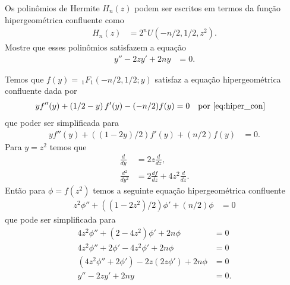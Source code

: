 \documentclass[a4paper,12pt, leqno, answers]{exam}
\begin{document}
\begin{questions}
     Os polinômios de Hermite $H_n(z)$ podem ser escritos em termos da fun\c{c}\~{a}o hipergeom\'{e}trica confluente como
    \begin{align*}
        H_n(z) &= 2^n U(-n/2, 1/2, z^2).
    \end{align*}
    Mostre que esses polin\^{o}mios satisfazem a equa\c{c}\~{a}o
    \begin{align*}
        y'' - 2 zy' + 2ny &= 0.
    \end{align*}
    \begin{solution}
        Temos que $f(y) = \,_1F_1(-n/2, 1/2; y)$ satisfaz a equa\c{c}\~{a}o hipergeom\'{e}trica confluente dada por
        \begin{align*}
            y f''(y) + \left( 1/2 - y \right) f'(y) - (-n/2) f(y) &= 0 && \text{por \eqref{eq:hiper_con}}
        \end{align*}
        que poder ser simplificada para
        \begin{align*}
            y f''(y) + \left( (1 - 2y) / 2 \right) f'(y) + (n/2) f(y) &= 0.
        \end{align*}
        Para $y = z^2$ temos que
        \begin{align*}
            \frac{d}{dy} &= 2 z \frac{d}{dz}, \\
            \frac{d^2}{dy^2} &= 2 \frac{df}{dz} + 4 z^2 \frac{d}{dz}.
        \end{align*}
        Ent\~{a}o para $\phi = f(z^2)$ temos a seguinte equa\c{c}\~{a}o hipergeom\'{e}trica confluente
        \begin{align*}
            z^2 \phi'' + \left( (1 - 2z^2)/2 \right) \phi' + (n/2) \phi &= 0
        \end{align*}
        que pode ser simplificada para
        \begin{align*}
            4 z^2 \phi'' + \left( 2 - 4z^2 \right) \phi' + 2n \phi &= 0 \\
            4 z^2 \phi'' + 2 \phi' - 4z^2 \phi' + 2n \phi &= 0 \\
            ( 4 z^2 \phi'' + 2 \phi') - 2 z (2 z \phi') + 2n \phi &= 0 \\
            y'' - 2 z y' + 2n y &= 0.
        \end{align*}
    \end{solution}


\end{questions}
\end{document}
